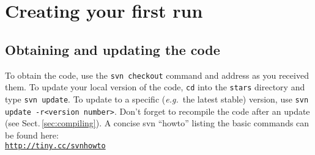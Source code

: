\section{Creating your first run}
\label{sec:firstrun}


\subsection{Obtaining and updating the code}
\label{sec:obtaining}
To obtain the code, use the \texttt{svn checkout} command and address as you received them.
To update your local version of the code, \texttt{cd} into the \texttt{stars} directory and type \texttt{svn update}.  
To update to a specific (\emph{e.g.}\ the latest stable) version, use \texttt{svn update -r<version number>}. 
Don't forget to recompile the code after an update (see Sect.\,\ref{sec:compiling}).
A concise svn ``howto'' listing the basic commands can be found here: \\
\href{http://tiny.cc/svnhowto}{\texttt{http://tiny.cc/svnhowto}}


